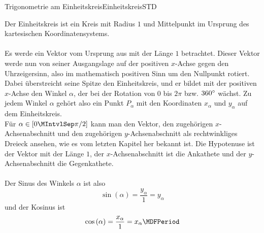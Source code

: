 \begin{MXContent}{Trigonometrie am Einheitskreis}{Einheitskreis}{STD}
\begin{center}
{
}
%
\end{center}

Der Einheitskreis ist ein Kreis mit Radius $1$ und Mittelpunkt im Ursprung des kartesischen Koordinatensystems.\\
\ \\
 Es werde ein Vektor vom Ursprung aus mit der L\"ange $1$ betrachtet. Dieser Vektor werde nun von seiner Ausgangslage auf der positiven $x$-Achse gegen den Uhrzeigersinn, also im mathematisch positiven Sinn um den Nullpunkt rotiert. Dabei \"uberstreicht seine Spitze den Einheitskreis, und er bildet mit der positiven $x$-Achse den Winkel $\alpha$, der bei der Rotation von $0$ bis $2\pi$ bzw. $360{}^{\circ}$ w\"achst. Zu jedem Winkel $\alpha$ geh\"ort also ein Punkt $P_\alpha$ mit den Koordinaten $x_\alpha$ und $y_\alpha$ auf dem Einheitskreis.
\ \\
F\"ur $\alpha\in\left[0\MIntvlSep \pi/2\right]$ kann man den Vektor, den zugeh\"origen $x$-Achsenabschnitt und den zugeh\"origen $y$-Achsenabschnitt als rechtwinkliges Dreieck ansehen, wie es vom letzten Kapitel her bekannt ist. Die Hypotenuse ist der Vektor mit der L\"ange $1$, der $x$-Achsenabschnitt ist die Ankathete und der $y$-Achsenabschnitt die Gegenkathete.\\
\ \\
Der Sinus des Winkels $\alpha$ ist also
\[\sin\left(\alpha\right)=\frac{y_\alpha}{1}=y_\alpha\]
und der Kosinus ist
\[\cos\left(\alpha\right)=\frac{x_\alpha}{1}=x_\alpha \MDFPeriod\]


\end{MXContent}

